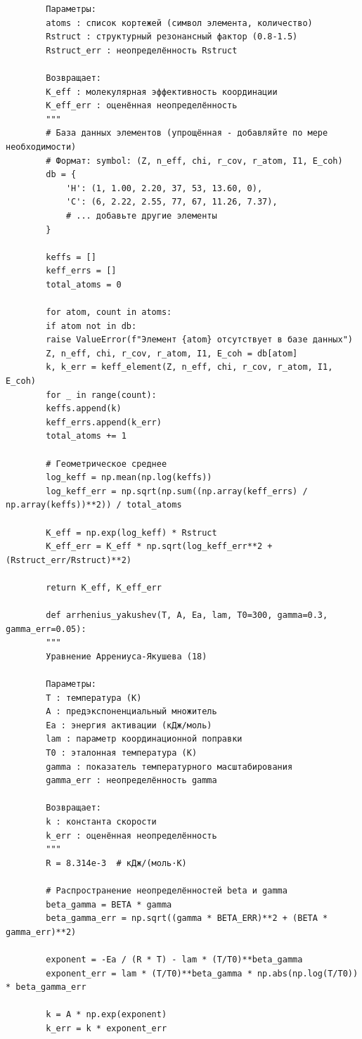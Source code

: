 \documentclass[12pt,a4paper]{article}
\theoremstyle{remark}
\begin{document}
\begin{verbatim}
		Параметры:
		atoms : список кортежей (символ элемента, количество)
		Rstruct : структурный резонансный фактор (0.8-1.5)
		Rstruct_err : неопределённость Rstruct
		
		Возвращает:
		K_eff : молекулярная эффективность координации
		K_eff_err : оценённая неопределённость
		"""
		# База данных элементов (упрощённая - добавляйте по мере необходимости)
		# Формат: symbol: (Z, n_eff, chi, r_cov, r_atom, I1, E_coh)
		db = {
			'H': (1, 1.00, 2.20, 37, 53, 13.60, 0),
			'C': (6, 2.22, 2.55, 77, 67, 11.26, 7.37),
			# ... добавьте другие элементы
		}
		
		keffs = []
		keff_errs = []
		total_atoms = 0
		
		for atom, count in atoms:
		if atom not in db:
		raise ValueError(f"Элемент {atom} отсутствует в базе данных")
		Z, n_eff, chi, r_cov, r_atom, I1, E_coh = db[atom]
		k, k_err = keff_element(Z, n_eff, chi, r_cov, r_atom, I1, E_coh)
		for _ in range(count):
		keffs.append(k)
		keff_errs.append(k_err)
		total_atoms += 1
		
		# Геометрическое среднее
		log_keff = np.mean(np.log(keffs))
		log_keff_err = np.sqrt(np.sum((np.array(keff_errs) / np.array(keffs))**2)) / total_atoms
		
		K_eff = np.exp(log_keff) * Rstruct
		K_eff_err = K_eff * np.sqrt(log_keff_err**2 + (Rstruct_err/Rstruct)**2)
		
		return K_eff, K_eff_err
		
		def arrhenius_yakushev(T, A, Ea, lam, T0=300, gamma=0.3, gamma_err=0.05):
		"""
		Уравнение Аррениуса-Якушева (18)
		
		Параметры:
		T : температура (K)
		A : предэкспоненциальный множитель
		Ea : энергия активации (кДж/моль)
		lam : параметр координационной поправки
		T0 : эталонная температура (K)
		gamma : показатель температурного масштабирования
		gamma_err : неопределённость gamma
		
		Возвращает:
		k : константа скорости
		k_err : оценённая неопределённость
		"""
		R = 8.314e-3  # кДж/(моль·K)
		
		# Распространение неопределённостей beta и gamma
		beta_gamma = BETA * gamma
		beta_gamma_err = np.sqrt((gamma * BETA_ERR)**2 + (BETA * gamma_err)**2)
		
		exponent = -Ea / (R * T) - lam * (T/T0)**beta_gamma
		exponent_err = lam * (T/T0)**beta_gamma * np.abs(np.log(T/T0)) * beta_gamma_err
		
		k = A * np.exp(exponent)
		k_err = k * exponent_err
		

\end{verbatim}
\end{document}
